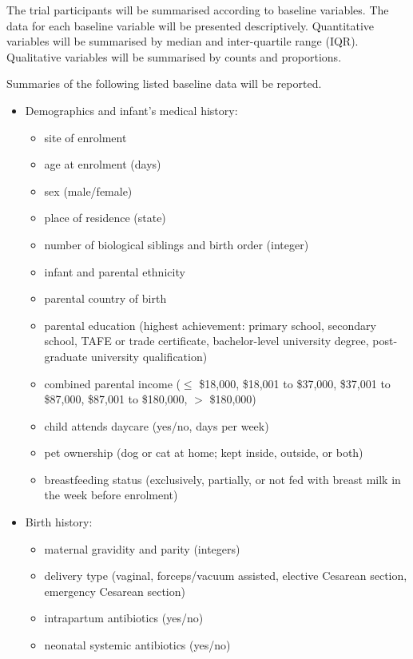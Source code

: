 \documentclass{bmcart}
\begin{document}
The trial participants will be summarised according to baseline variables.
The data for each baseline variable will be presented descriptively.
Quantitative variables will be summarised by median and inter-quartile range (IQR).
Qualitative variables will be summarised by counts and proportions.

Summaries of the following listed baseline data will be reported.

\begin{itemize}
    \item Demographics and infant’s medical history:
    \begin{itemize}
        \item site of enrolment
        \item age at enrolment (days)
        \item sex (male/female)
        \item place of residence (state)
        \item number of biological siblings and birth order (integer)
        \item infant and parental ethnicity
        \item parental country of birth
        \item parental education (highest achievement: primary school, secondary school, TAFE or trade certificate, bachelor-level university degree, post-graduate university qualification)
	    \item combined parental income ($\leq$ \$18,000, \$18,001 to \$37,000, \$37,001 to \$87,000, \$87,001 to \$180,000, $>$ \$180,000)
	    \item child attends daycare (yes/no, days per week)
	    \item pet ownership (dog or cat at home; kept inside, outside, or both)
	    \item breastfeeding status (exclusively, partially, or not fed with breast milk in the week before enrolment)
    \end{itemize}
    \item Birth history:
    \begin{itemize}
        \item maternal gravidity and parity (integers)
        \item delivery type (vaginal, forceps/vacuum assisted, elective Cesarean section, emergency Cesarean section)
        \item intrapartum antibiotics (yes/no)
        \item neonatal systemic antibiotics (yes/no)

\end{itemize}
\end{itemize}
\end{document}
